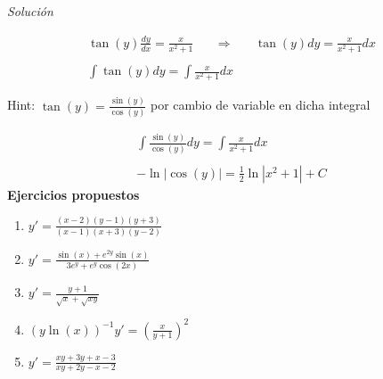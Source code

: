 \textit{Solución}

\begin{equation*}
    \begin{gathered}
        \tan(y)\frac{dy}{dx}=\frac{x}{x^{2}+1}\;\;\;\;\;\;\Rightarrow\;\;\;\;\;\; \tan(y)dy=\frac{x}{x^{2}+1}dx\\\\
        \int \tan(y)dy=\int\frac{x}{x^{2}+1}dx
    \end{gathered}
\end{equation*}

Hint: \(\displaystyle \tan(y)=\frac{\sin(y)}{\cos(y)}\) por cambio de variable en dicha integral

\begin{equation*}
    \begin{gathered}
        \int\frac{\sin(y)}{\cos(y)}dy=\int\frac{x}{x^{2}+1}dx\\\\
        -\ln\left|\cos(y)\right|=\frac{1}{2}\ln\left|x^{2}+1\right|+C
    \end{gathered}
\end{equation*}
\textbf{Ejercicios propuestos}
\begin{enumerate}
  \item \(\displaystyle y'=\frac{(x-2)(y-1)(y+3)}{(x-1)(x+3)(y-2)}\)
  \item \(\displaystyle y'=\frac{\sin(x)+e^{2y}\sin(x)}{3e^{y}+e^{y}\cos(2x)}\)
  \item \(\displaystyle y'=\frac{y+1}{\sqrt{x}+\sqrt{xy}}\)
  \item \(\displaystyle \left(y\ln(x)\right)^{-1}y'=\left(\frac{x}{y+1}\right)^{2}\)
  \item \(\displaystyle y'=\frac{xy+3y+x-3}{xy+2y-x-2}\)
\end{enumerate}


